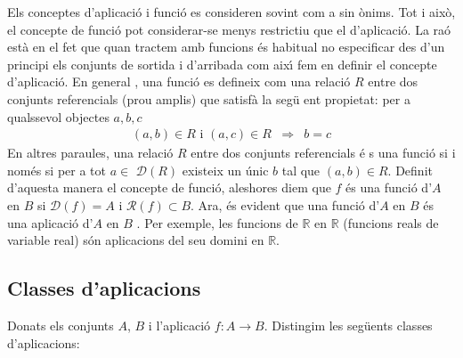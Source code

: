 \begin{obs}
Els conceptes d'aplicaci\'{o} i funci\'{o} es consideren sovint com a sin%
\`{o}nims. Tot i aix\`{o}, el concepte de funci\'{o} pot considerar-se menys
restrictiu que el d'aplicaci\'{o}. La ra\'{o} est\`{a} en el fet que quan
tractem amb funcions \'{e}s habitual no especificar des d'un principi els
conjunts de sortida i d'arribada com aix\'{\i} fem en definir el concepte
d'aplicaci\'{o}. En general , una funci\'{o} es defineix com una relaci\'{o}
$R$ entre dos conjunts referencials (prou amplis) que satisf\`{a} la seg\"{u}%
ent propietat: per a qualssevol objectes $a,b,c$%
\begin{equation*}
\begin{array}{ccc}
(a,b)\in R\text{ i }(a,c)\in R & \Longrightarrow & b=c%
\end{array}
\end{equation*}
En altres paraules, una relaci\'{o} $R$ entre dos conjunts referencials \'{e}%
s una funci\'{o} si i nom\'{e}s si per a tot $a\in$ $\mathcal{D}(R)$
existeix un \'{u}nic $b$ tal que $(a,b)\in R$. Definit d'aquesta manera el
concepte de funci\'{o}, aleshores diem que $f$ \'{e}s una funci\'{o} d'$A$
en $B$ si $\mathcal{D}(f)=A$ i $\mathcal{R}(f)\subset B$. Ara, \'{e}s
evident que una funci\'{o} d'$A$ en $B$ \'{e}s una aplicaci\'{o} d'$A$ en $B$%
. Per exemple, les funcions de $\mathbb{R}$ en $\mathbb{R}$ (funcions reals
de variable real) s\'{o}n aplicacions del seu domini en $\mathbb{R}$.
\end{obs}

\subsection{Classes d'aplicacions}

Donats els conjunts $A$, $B$ i l'aplicaci\'{o} $f:A\longrightarrow B$.
Distingim les seg\"{u}ents classes d'aplicacions:

